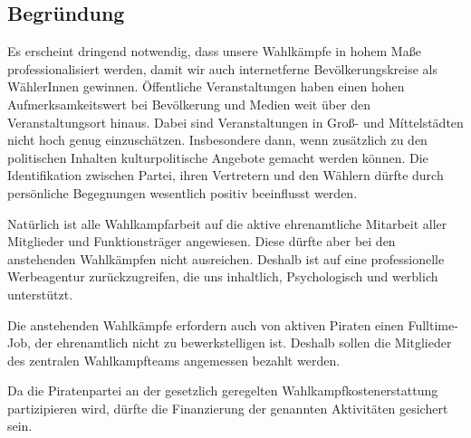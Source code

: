 \subsection{Begründung}
Es erscheint dringend notwendig, dass unsere Wahlkämpfe in hohem Maße professionalisiert
werden, damit wir auch internetferne Bevölkerungskreise als WählerInnen gewinnen. Öffentliche
Veranstaltungen haben einen hohen Aufmerksamkeitswert bei Bevölkerung und Medien weit über
den Veranstaltungsort hinaus. Dabei sind Veranstaltungen in Groß- und Míttelstädten nicht hoch
genug einzuschätzen. Insbesondere dann, wenn zusätzlich zu den politischen Inhalten
kulturpolitische Angebote gemacht werden können. Die Identifikation zwischen Partei, ihren
Vertretern und den Wählern dürfte durch persönliche Begegnungen wesentlich positiv beeinflusst
werden.\par
Natürlich ist alle Wahlkampfarbeit auf die aktive ehrenamtliche Mitarbeit aller Mitglieder und
Funktionsträger angewiesen. Diese dürfte aber bei den anstehenden Wahlkämpfen nicht ausreichen.
Deshalb ist auf eine professionelle Werbeagentur zurückzugreifen, die uns inhaltlich, Psychologisch
und werblich unterstützt.\par
Die anstehenden Wahlkämpfe erfordern auch von aktiven Piraten einen Fulltime-Job, der
ehrenamtlich nicht zu bewerkstelligen ist. Deshalb sollen die Mitglieder des zentralen
Wahlkampfteams angemessen bezahlt werden.\par
Da die Piratenpartei an der gesetzlich geregelten Wahlkampfkostenerstattung partizipieren wird,
dürfte die Finanzierung der genannten Aktivitäten gesichert sein.
